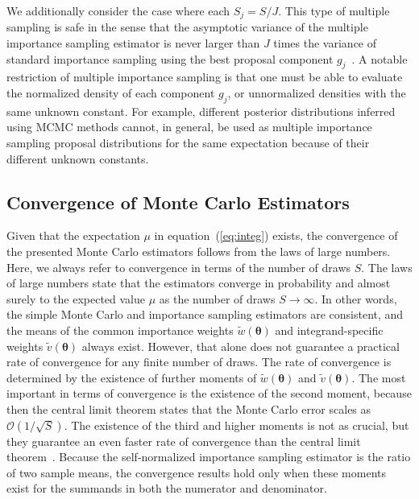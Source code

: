\documentclass[12pt]{article}
\newcommand{\ome}{v}
\begin{document}
We additionally consider the case where each $S_j = S/J$.
This type of multiple sampling is safe in the sense that the asymptotic variance of the 
multiple importance sampling estimator is never larger than $J$ times the variance of
standard importance sampling using
the best proposal component $g_j$~\citep{he2014optimal}.
A notable restriction of multiple importance sampling is that
one must be able to evaluate the normalized density of each component $g_j$, or
unnormalized densities with the same unknown constant.
For example, different posterior distributions
inferred using MCMC methods cannot, in general, be used as
multiple importance sampling proposal distributions
for the same expectation because of their different unknown constants.










\subsection{Convergence of Monte Carlo Estimators} \label{sec:conv}


Given that the expectation $\mu$ in equation~(\ref{eq:integ}) exists,
the convergence of the presented Monte Carlo estimators
follows from the laws of large numbers.
Here, we always refer to convergence in terms of the number of draws $S$.
The laws of large numbers state that the estimators
converge in probability and almost surely to the expected value $\mu$
as the number of draws $S \rightarrow \infty$.
In other words, the simple Monte Carlo and importance sampling estimators are consistent, and
the means of the common importance weights
$\widetilde{w} (\boldsymbol{\theta})$ and integrand-specific weights $\widetilde{\ome} (\boldsymbol{\theta})$
always exist.
However, that alone does not guarantee
a practical rate of convergence for any finite number of draws.
The rate of convergence is determined by the existence of further moments
of $\widetilde{w} (\boldsymbol{\theta})$ and $\widetilde{\ome} (\boldsymbol{\theta})$.
The most important in terms of convergence is the existence of the second moment, because then
the central limit theorem states that the Monte Carlo error scales as $\mathcal{O} (1/ \sqrt{S})$.
The existence of the third and higher moments is not as crucial,
but they guarantee an even faster rate of convergence than
the central limit theorem~\citep{geweke1989bayesian,tierney1994markov,chen2004normal}.
Because the self-normalized importance sampling estimator is the ratio of two sample means, the
convergence results hold only when these
moments exist for the summands in both the numerator and denominator.
\end{document}
